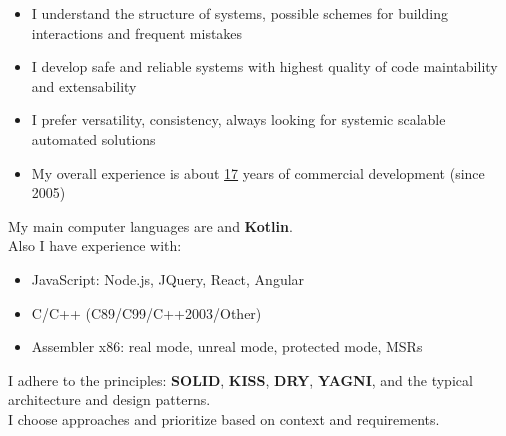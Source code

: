     \begin{minipage}[t]{0.4\textwidth} %
        \vspace{-\baselineskip} %
        

        \begin{itemize}[leftmargin=-.0in]
        	\setlength\itemsep{0em}
            \item I understand the structure of systems, possible schemes for building interactions and frequent mistakes
            \item I develop safe and reliable systems with highest quality of code maintability and extensability
            \item I prefer versatility, consistency, always looking for systemic scalable automated solutions
            \item My overall experience is about \underline{17} years of commercial development (since 2005)
        \end{itemize}

    \end{minipage}
    \hfill %
    \begin{minipage}[t]{0.5\textwidth} %
        \vspace{-\baselineskip}
        
        
        My main computer languages are  and \textbf{Kotlin}.\\
        Also I have experience with:
        \begin{itemize}[leftmargin=.2in]
        	\setlength\itemsep{0em}
            \item{JavaScript: Node.js, JQuery, React, Angular}
            \item{C/C++ (C89/C99/C++2003/Other)}
            \item{Assembler x86: real mode, unreal mode, protected mode, MSRs}
        \end{itemize}

        I adhere to the principles: \textbf{SOLID}, \textbf{KISS}, \textbf{DRY}, \textbf{YAGNI},
        and the typical architecture and design patterns.\\
        I choose approaches and prioritize based on context and requirements.
    \end{minipage}

\vspace{0.5cm}
